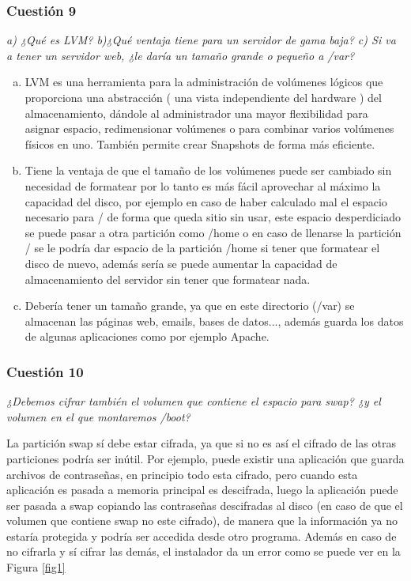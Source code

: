 \subsubsection{Cuestión 9}
\textit{a) ¿Qué es LVM? b)¿Qué ventaja tiene para un servidor de gama baja? c) Si va a tener un servidor web, ¿le daría un tamaño grande o pequeño a /var?} \newline
\begin{enumerate}[a)]
    \item LVM es una herramienta para la administración de volúmenes lógicos que proporciona una abstracción ( una vista independiente del hardware ) del almacenamiento, dándole al administrador una mayor flexibilidad para asignar espacio, redimensionar volúmenes o para combinar varios volúmenes físicos en uno. También permite crear Snapshots de forma más eficiente.  \cite{lvm1} \cite{lvm2}
    \item Tiene la ventaja de que el tamaño de los volúmenes puede ser cambiado sin necesidad de formatear por lo tanto es más fácil aprovechar al máximo la capacidad del disco, por ejemplo en caso de haber calculado mal el espacio necesario para / de forma que queda sitio sin usar, este espacio desperdiciado se puede pasar a otra partición como /home o en caso de llenarse la partición / se le podría dar espacio de la partición /home si tener que formatear el disco de nuevo, además sería se puede aumentar la capacidad de almacenamiento del servidor sin tener que formatear nada. \cite{lvm3}
    \item Debería tener un tamaño grande, ya que en este directorio (/var) se almacenan las páginas web, emails, bases de datos..., además guarda los datos de algunas aplicaciones como por ejemplo Apache. \cite{var2}  \cite{var}
\end{enumerate}

\subsubsection{Cuestión 10}
\textit{¿Debemos cifrar también el volumen que contiene el espacio para swap? ¿y el volumen en el que montaremos /boot?} \newline

La partición swap sí debe estar cifrada, ya que si no es así el cifrado de las otras particiones podría ser inútil. Por ejemplo, puede existir una aplicación que guarda archivos de contraseñas, en principio todo esta cifrado, pero cuando esta aplicación es pasada a memoria principal es descifrada, luego la aplicación puede ser pasada a swap copiando las contraseñas descifradas al disco (en caso de que el volumen que contiene swap no este cifrado), de manera que la información ya no estaría protegida y podría ser accedida desde otro programa. \cite{swap} Además en caso de no cifrarla y sí cifrar las demás, el instalador da un error como se puede ver en la Figura \ref{fig1}

